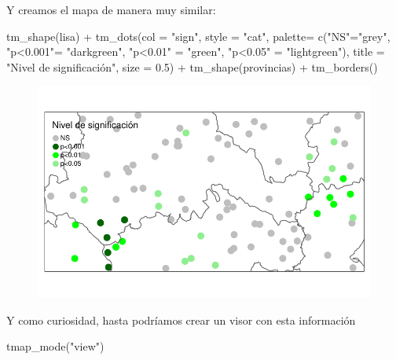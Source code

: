 \documentclass[
  letterpaper,
  DIV=11,
  numbers=noendperiod]{scrreprt}
\newenvironment{Shaded}{\begin{snugshade}}{\end{snugshade}}
\newcommand{\AttributeTok}[1]{\textcolor[rgb]{0.40,0.45,0.13}{#1}}
\newcommand{\FloatTok}[1]{\textcolor[rgb]{0.68,0.00,0.00}{#1}}
\newcommand{\FunctionTok}[1]{\textcolor[rgb]{0.28,0.35,0.67}{#1}}
\newcommand{\NormalTok}[1]{\textcolor[rgb]{0.00,0.23,0.31}{#1}}
\newcommand{\OtherTok}[1]{\textcolor[rgb]{0.00,0.23,0.31}{#1}}
\newcommand{\SpecialCharTok}[1]{\textcolor[rgb]{0.37,0.37,0.37}{#1}}
\newcommand{\StringTok}[1]{\textcolor[rgb]{0.13,0.47,0.30}{#1}}
\begin{document}
Y creamos el mapa de manera muy similar:

\begin{Shaded}
\begin{Highlighting}[]
\FunctionTok{tm\_shape}\NormalTok{(lisa) }\SpecialCharTok{+}
    \FunctionTok{tm\_dots}\NormalTok{(}\AttributeTok{col =} \StringTok{"sign"}\NormalTok{,}
          \AttributeTok{style =} \StringTok{"cat"}\NormalTok{,}
          \AttributeTok{palette=} \FunctionTok{c}\NormalTok{(}\StringTok{"NS"}\OtherTok{=}\StringTok{"grey"}\NormalTok{,}
                     \StringTok{"p\textless{}0.001"}\OtherTok{=} \StringTok{"darkgreen"}\NormalTok{,}
                     \StringTok{"p\textless{}0.01"} \OtherTok{=} \StringTok{"green"}\NormalTok{,}
                     \StringTok{"p\textless{}0.05"} \OtherTok{=}  \StringTok{"lightgreen"}\NormalTok{), }
          \AttributeTok{title =} \StringTok{"Nivel de significación"}\NormalTok{,}
          \AttributeTok{size =} \FloatTok{0.5}\NormalTok{) }\SpecialCharTok{+}
    \FunctionTok{tm\_shape}\NormalTok{(provincias) }\SpecialCharTok{+}
    \FunctionTok{tm\_borders}\NormalTok{()}
\end{Highlighting}
\end{Shaded}

\begin{figure}[H]

{\centering \includegraphics{04_AutocorrelacionEspacial_files/figure-pdf/unnamed-chunk-21-1.pdf}

}

\end{figure}

Y como curiosidad, hasta podríamos crear un visor con esta información

\begin{Shaded}
\begin{Highlighting}[]
\FunctionTok{tmap\_mode}\NormalTok{(}\StringTok{"view"}\NormalTok{)}
\end{Highlighting}
\end{Shaded}
\end{document}
